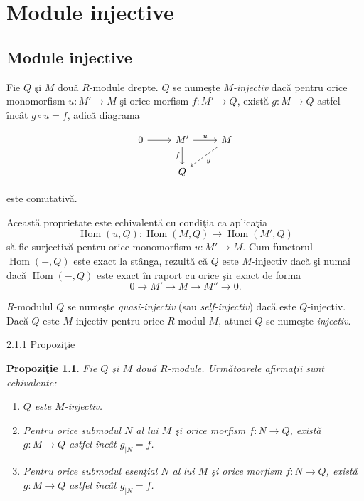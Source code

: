 \documentclass[12pt,a4paper]{book}
\DeclareMathOperator{\Hom}{Hom}
\theoremstyle{plain}
\newtheorem{proposition}[theorem]{Propoziţie}
\theoremstyle{definition}
\theoremstyle{remark}
\begin{document}
\chapter{Module injective}
\section{Module injective}

Fie \(Q\) şi \(M\) două \(R\)-module drepte.
\(Q\) se numeşte \emph{\(M\)-injectiv} dacă pentru orice monomorfism
\(u : M' \to M\) şi orice morfism \(f : M' \to Q\), există
\(g : M \to Q\) astfel încât \(g \circ u = f\), adică diagrama

\[
\begin{tikzcd}
0 \arrow[r] & M' \arrow[r,"u"] \arrow[d,"f"'] & M \arrow[dl,dashed,"g"] \\
            & Q &
\end{tikzcd}
\]

este comutativă.

Această proprietate este echivalentă cu condiţia ca aplicaţia
\[
\Hom(u,Q) : \Hom(M,Q) \longrightarrow \Hom(M',Q)
\]
să fie surjectivă pentru orice monomorfism \(u : M' \to M\).
Cum functorul \(\Hom(-,Q)\) este exact la stânga, rezultă că \(Q\) este
\(M\)-injectiv dacă şi numai dacă \(\Hom(-,Q)\) este exact în raport cu orice
şir exact de forma
\[
0 \longrightarrow M' \longrightarrow M \longrightarrow M'' \longrightarrow 0.
\]

\(R\)-modulul \(Q\) se numeşte \emph{quasi-injectiv} (sau \emph{self-injectiv})
dacă este \(Q\)-injectiv.
Dacă \(Q\) este \(M\)-injectiv pentru orice \(R\)-modul \(M\), atunci
\(Q\) se numeşte \emph{injectiv}.

2.1.1 Propoziţie

\begin{proposition}
Fie \(Q\) şi \(M\) două \(R\)-module.
Următoarele afirmaţii sunt echivalente:
\begin{enumerate}
  \item \(Q\) este \(M\)-injectiv.
  \item Pentru orice submodul \(N\) al lui \(M\) şi orice morfism
        \(f : N \to Q\), există \(g : M \to Q\) astfel încât
        \(g_{\mid N} = f\).
  \item Pentru orice submodul esenţial \(N\) al lui \(M\) şi orice morfism
        \(f : N \to Q\), există \(g : M \to Q\) astfel încât
        \(g_{\mid N} = f\).
\end{enumerate}
\end{proposition}
\end{document}
